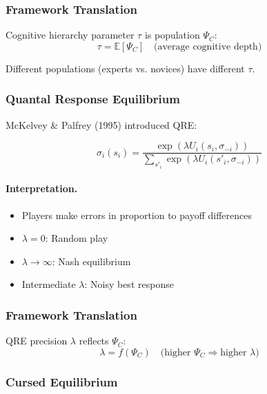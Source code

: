 \subsubsection{Framework Translation}

Cognitive hierarchy parameter $\tau$ is population $\Psi_C$:
\begin{equation}
\tau = \mathbb{E}[\Psi_C] \quad \text{(average cognitive depth)}
\end{equation}

Different populations (experts vs. novices) have different $\tau$.

\subsubsection{Quantal Response Equilibrium}

McKelvey \& Palfrey (1995) introduced QRE:

\begin{equation}
\boxed{
\sigma_i(s_i) = \frac{\exp(\lambda U_i(s_i, \sigma_{-i}))}{\sum_{s'_i} \exp(\lambda U_i(s'_i, \sigma_{-i}))}
}
\label{eq:qre}
\end{equation}

\paragraph{Interpretation.}
\begin{itemize}
    \item Players make errors in proportion to payoff differences
    \item $\lambda = 0$: Random play
    \item $\lambda \to \infty$: Nash equilibrium
    \item Intermediate $\lambda$: Noisy best response
\end{itemize}

\subsubsection{Framework Translation}

QRE precision $\lambda$ reflects $\Psi_C$:
\begin{equation}
\lambda = f(\Psi_C) \quad \text{(higher } \Psi_C \Rightarrow \text{higher } \lambda)
\end{equation}

\subsubsection{Cursed Equilibrium}

